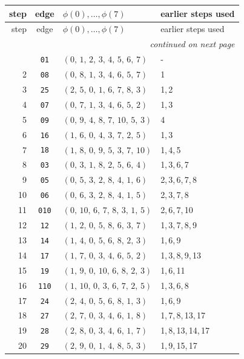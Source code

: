 \begin{longtable}{r c p{} p{}}
\toprule
step & edge & $\phi(0),\ldots,\phi(7)$ & earlier steps used \\*
\midrule
\endfirsthead
\toprule
step & edge & $\phi(0),\ldots,\phi(7)$ & earlier steps used \\*
\midrule
\endhead
\midrule
\multicolumn{4}{r}{\emph{continued on next page}}\\
\endfoot
\bottomrule
\endlastfoot
1 & \texttt{01} & $(0,\,1,\,2,\,3,\,4,\,5,\,6,\,7)$ & - \\
2 & \texttt{08} & $(0,\,8,\,1,\,3,\,4,\,6,\,5,\,7)$ & 1 \\
3 & \texttt{25} & $(2,\,5,\,0,\,1,\,6,\,7,\,8,\,3)$ & 1,\,2 \\
4 & \texttt{07} & $(0,\,7,\,1,\,3,\,4,\,6,\,5,\,2)$ & 1,\,3 \\
5 & \texttt{09} & $(0,\,9,\,4,\,8,\,7,\,10,\,5,\,3)$ & 4 \\
6 & \texttt{16} & $(1,\,6,\,0,\,4,\,3,\,7,\,2,\,5)$ & 1,\,3 \\
7 & \texttt{18} & $(1,\,8,\,0,\,9,\,5,\,3,\,7,\,10)$ & 1,\,4,\,5 \\
8 & \texttt{03} & $(0,\,3,\,1,\,8,\,2,\,5,\,6,\,4)$ & 1,\,3,\,6,\,7 \\
9 & \texttt{05} & $(0,\,5,\,3,\,2,\,8,\,4,\,1,\,6)$ & 2,\,3,\,6,\,7,\,8 \\
10 & \texttt{06} & $(0,\,6,\,3,\,2,\,8,\,4,\,1,\,5)$ & 2,\,3,\,7,\,8 \\
11 & \texttt{010} & $(0,\,10,\,6,\,7,\,8,\,3,\,1,\,5)$ & 2,\,6,\,7,\,10 \\
12 & \texttt{12} & $(1,\,2,\,0,\,5,\,8,\,6,\,3,\,7)$ & 1,\,3,\,7,\,8,\,9 \\
13 & \texttt{14} & $(1,\,4,\,0,\,5,\,6,\,8,\,2,\,3)$ & 1,\,6,\,9 \\
14 & \texttt{17} & $(1,\,7,\,0,\,3,\,4,\,6,\,5,\,2)$ & 1,\,3,\,8,\,9,\,13 \\
15 & \texttt{19} & $(1,\,9,\,0,\,10,\,6,\,8,\,2,\,3)$ & 1,\,6,\,11 \\
16 & \texttt{110} & $(1,\,10,\,0,\,3,\,6,\,7,\,2,\,5)$ & 1,\,3,\,6,\,8 \\
17 & \texttt{24} & $(2,\,4,\,0,\,5,\,6,\,8,\,1,\,3)$ & 1,\,6,\,9 \\
18 & \texttt{27} & $(2,\,7,\,0,\,3,\,4,\,6,\,1,\,8)$ & 1,\,7,\,8,\,13,\,17 \\
19 & \texttt{28} & $(2,\,8,\,0,\,3,\,4,\,6,\,1,\,7)$ & 1,\,8,\,13,\,14,\,17 \\
20 & \texttt{29} & $(2,\,9,\,0,\,1,\,4,\,8,\,5,\,3)$ & 1,\,9,\,15,\,17 \\

\end{longtable}
